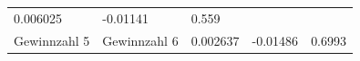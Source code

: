 \documentclass[ngerman,]{article}
\begin{document}
\begin{longtable}[]{@{}lllll@{}}
\begin{minipage}[t]{0.19\columnwidth}
0.006025\strut
\end{minipage} & \begin{minipage}[t]{0.19\columnwidth}\raggedright\strut
-0.01141\strut
\end{minipage} & \begin{minipage}[t]{0.07\columnwidth}\raggedright\strut
0.559\strut
\end{minipage}\tabularnewline
\begin{minipage}[t]{0.23\columnwidth}\raggedright\strut
Gewinnzahl 5\strut
\end{minipage} & \begin{minipage}[t]{0.19\columnwidth}\raggedright\strut
Gewinnzahl 6\strut
\end{minipage} & \begin{minipage}[t]{0.19\columnwidth}\raggedright\strut
0.002637\strut
\end{minipage} & \begin{minipage}[t]{0.19\columnwidth}\raggedright\strut
-0.01486\strut
\end{minipage} & \begin{minipage}[t]{0.07\columnwidth}\raggedright\strut
0.6993\strut
\end{minipage}\tabularnewline
\bottomrule
\end{longtable}
\end{document}
